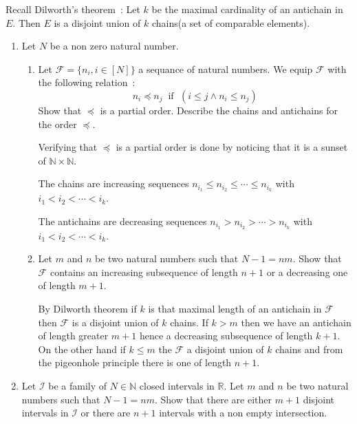 \documentclass[a4paper,11pt]{exam}
\newcommand{\N}{\mathbb{N}}
\newcommand{\R}{\mathbb{R}}
\begin{document}
\begin{questions}
		Recall Dilworth’s theorem~: 
		Let $k$ be the maximal cardinality of an antichain in $E$.
		Then $E$ is a disjoint union of $k$ chains(a set of comparable elements).		
		\begin{enumerate}			
			\item Let $N$ be a non zero natural number. 
			\begin{enumerate}
				\item Let $\mathcal{F}=\{n_i, i\in [N]\}$ a sequance of natural numbers.
				We equip $\mathcal{F}$ with the following relation~:
				\[
				n_i \preceq n_j \; \; \textrm{if }\; ( i\leq j \wedge n_i\leq n_j )
				\]
				Show that $\preceq$ is a partial order.
				Describe the chains and antichains for the order $\preceq$.
				
				\begin{solution}
					Verifying that $\preceq$ is a partial order is done by noticing that it is a sunset of $\N\times\N$.
					
					The chains are increasing sequences
					$n_{i_1} \leq n_{i_2} \leq \cdots \leq n_{i_k}$ with
					${i_1 < i_2 < \cdots < i_k}$.
					
					The antichains are decreasing sequences 
					$n_{i_1} > n_{i_2} > \cdots > n_{i_k}$ with
					${i_1 < i_2 < \cdots < i_k}$.
				\end{solution}
				
				\item Let $m$ and $n$ be two natural numbers such that $N-1=nm$.
				Show that $\mathcal{F}$ contains an increasing subsequence of length $n+1$ or a decreasing one of length $m+1$.
				
				\begin{solution}
					By Dilworth theorem if $k$ is that maximal length of an antichain in $\mathcal{F}$ then $\mathcal{F}$ is a disjoint union of $k$ chains. 
					If $k>m$ then we have an antichain of length greater $m+1$ hence a decreasing subsequence of length $k+1$. On the other hand if  $k\leq m$ the $\mathcal{F}$  a disjoint union of $k$ chains and from the pigeonhole principle there is one of length $n+1$.
				\end{solution}
			\end{enumerate}
			
			\item Let  $\mathcal{I}$ be a family of $N\in \N$ closed intervals in $\R$. Let $m$ and $n$ be two natural numbers such that $N-1=nm$.
			Show that there are either $m+1$ disjoint intervals in $\mathcal{I}$ or there are $n+1$ intervals with a non empty intersection.
			

\end{enumerate}
\end{questions}
\end{document}
